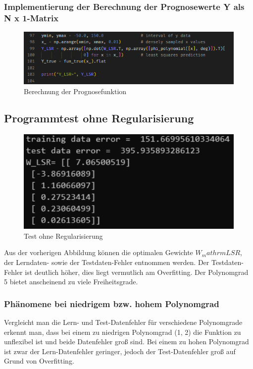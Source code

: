\subsubsection{Implementierung der Berechnung der Prognosewerte Y als N x 1-Matrix}

\begin{figure}[H]
    \centering
    \includegraphics[width=1\linewidth]{sections/v2a1_y_impl.png}
    \caption{Berechnung der Prognosefunktion}
\end{figure}

\subsection{Programmtest ohne Regularisierung}

\begin{figure}[H]
    \centering
    \includegraphics[width=1\linewidth]{sections/v2a1c1.png}
    \caption{Test ohne Regularisierung}
\end{figure}

Aus der vorherigen Abbildung können die optimalen Gewichte $W_mathrm{LSR}$,
der Lerndaten- sowie der Testdaten-Fehler entnommen werden. Der Testdaten-Fehler ist deutlich höher, dies liegt vermutlich am Overfitting. Der Polynomgrad 5 bietet anscheinend zu viele Freiheitsgrade.

\subsubsection{Phänomene bei niedrigem bzw. hohem Polynomgrad}
Vergleicht man die Lern- und Test-Datenfehler für verschiedene Polynomgrade erkennt man, dass bei einem zu niedrigen Polynomgrad (1, 2) die Funktion zu unflexibel ist und beide Datenfehler groß sind. Bei einem zu hohen Polynomgrad ist zwar der Lern-Datenfehler geringer, jedoch der Test-Datenfehler groß auf Grund von Overfitting.

